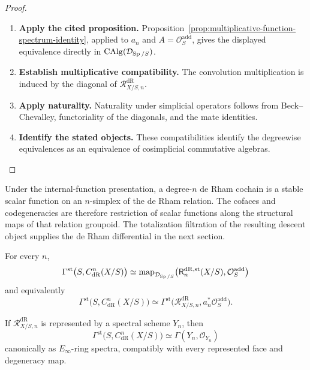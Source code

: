 \begin{proof}
\leavevmode
\begin{enumerate}[label=\textup{(\arabic*)}]
    \item \textbf{Apply the cited proposition.}
    Proposition~\ref{prop:multiplicative-function-spectrum-identity}, applied to
    \(a_n\) and \(A=\mathcal O_S^{\mathrm{add}}\), gives the displayed equivalence
    directly in \(\operatorname{CAlg}(\mathcal D_{\operatorname{Sp}/S})\).
    \item \textbf{Establish multiplicative compatibility.}
    The convolution multiplication is induced
    by the diagonal of \(\mathcal R^{\mathrm{dR}}_{X/S,n}\).
    \item \textbf{Apply naturality.}
    Naturality under simplicial operators follows from Beck--Chevalley, functoriality
    of the diagonals, and the mate identities.
    \item \textbf{Identify the stated objects.}
    These compatibilities identify the
    degreewise equivalences as an equivalence of cosimplicial commutative algebras.
\end{enumerate}
\end{proof}

\begin{remark}
Under the internal-function presentation, a degree-\(n\) de Rham cochain is a
stable scalar function on an \(n\)-simplex of the de Rham relation. The
cofaces and codegeneracies are therefore restriction of scalar functions along the
structural maps of that relation groupoid. The totalization filtration of the resulting descent object supplies the de Rham
differential in the next section.
\end{remark}

\begin{corollary}
For every \(n\),
\[
  \Gamma^{\mathrm{st}}
  \bigl(S,C^n_{\mathrm{dR}}(X/S)\bigr)
  \simeq
  \operatorname{map}_{\mathcal D_{\operatorname{Sp}/S}}
  \bigl(\mathsf{R}^{\mathrm{dR},\mathrm{st}}_n(X/S),\mathcal O_S^{\mathrm{add}}\bigr)
\]
and equivalently
\[
  \Gamma^{\mathrm{st}}
  \bigl(S,C^n_{\mathrm{dR}}(X/S)\bigr)
  \simeq
  \Gamma^{\mathrm{st}}
  \bigl(\mathcal R^{\mathrm{dR}}_{X/S,n},a_n^*\mathcal O_S^{\mathrm{add}}\bigr).
\]
\end{corollary}

\begin{proposition}
\label{prop:represented-function-spectrum-detailed}
If \(\mathcal R^{\mathrm{dR}}_{X/S,n}\) is represented by a spectral scheme \(Y_n\), then
\[
  \Gamma^{\mathrm{st}}
  \bigl(S,C^n_{\mathrm{dR}}(X/S)\bigr)
  \simeq
  \Gamma(Y_n,\mathcal O_{Y_n})
\]
canonically as \(E_\infty\)-ring spectra, compatibly with every represented face and
degeneracy map.
\end{proposition}

